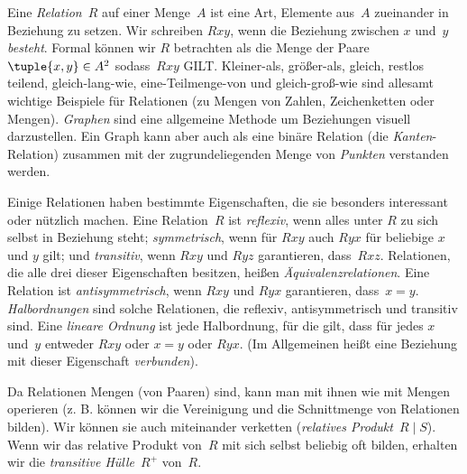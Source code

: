 Eine \emph{Relation}~$R$ auf einer Menge~$A$ ist eine Art, Elemente
aus~$A$ zueinander in Beziehung zu setzen. Wir schreiben $Rxy$, wenn die Beziehung zwischen $x$
und~$y$ \emph{besteht}. Formal können wir $R$ betrachten als die Menge der Paare
$\tuple{x,y} \in A^2$ sodass~$Rxy$ GILT. Kleiner-als, größer-als,
gleich, restlos teilend, gleich-lang-wie, eine-Teilmenge-von und gleich-groß-wie
sind allesamt wichtige Beispiele für Relationen (zu
Mengen von Zahlen, Zeichenketten oder Mengen). \emph{Graphen} sind eine allgemeine Methode
um Beziehungen visuell darzustellen. Ein Graph kann aber auch als eine
binäre Relation (die \emph{Kanten}-Relation) zusammen mit der
zugrundeliegenden Menge von \emph{Punkten} verstanden werden.

Einige Relationen haben bestimmte Eigenschaften, die sie besonders
interessant oder nützlich machen. Eine Relation~$R$ ist \emph{reflexiv}, wenn
alles unter $R$ zu sich selbst in Beziehung steht; \emph{symmetrisch}, wenn für  $Rxy$
auch $Ryx$ für beliebige $x$ und $y$ gilt; und \emph{transitiv}, wenn $Rxy$
und $Ryz$ garantieren, dass~$Rxz$. Relationen, die alle drei dieser
Eigenschaften besitzen, heißen \emph{Äquivalenzrelationen}. Eine Relation ist
\emph{antisymmetrisch}, wenn $Rxy$ und $Ryx$
garantieren, dass~$x=y$. \emph{Halbordnungen} sind solche Relationen, die
reflexiv, antisymmetrisch und transitiv sind. Eine \emph{lineare Ordnung} ist
jede Halbordnung, für die gilt, dass für jedes $x$ und~$y$ entweder
$Rxy$ oder $x=y$ oder $Ryx$. (Im Allgemeinen heißt eine Beziehung mit dieser Eigenschaft
\emph{verbunden}).

Da Relationen Mengen (von Paaren) sind, kann man mit ihnen wie mit Mengen operieren
(z. B. können wir die Vereinigung und die Schnittmenge von Relationen bilden). Wir können
sie auch miteinander verketten (\emph{relatives Produkt}~$R \mid S$). Wenn wir
das relative Produkt von~$R$ mit sich selbst beliebig oft bilden, erhalten wir die \emph{transitive Hülle}~$R^+$ von~$R$.